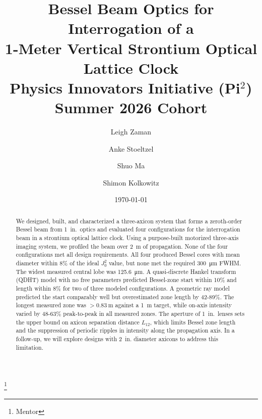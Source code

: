 \documentclass[
  aps,
  twocolumn,
  reprint,              %
  superscriptaddress,
  amsmath,
  amssymb,
  floatfix,
  longbibliography,      %
  nofootinbib %
]{revtex4-2}
\begin{document}
\title{Bessel Beam Optics for Interrogation of a \\ 1-Meter Vertical Strontium Optical Lattice Clock \\[0.4em] \normalsize\normalfont Physics Innovators Initiative (Pi$^2$) Summer 2026 Cohort}
\author{Leigh Zaman}

\author{Anke Stoeltzel}
\thanks{Mentor}

\author{Shuo Ma}

\author{Shimon Kolkowitz}

\date{\today}

\begin{abstract}

  We designed, built, and characterized a three-axicon system that forms a zeroth-order Bessel beam from 1~in.\ optics and evaluated four configurations for the interrogation beam in a strontium optical lattice clock. Using a purpose-built motorized three-axis imaging system, we profiled the beam over \SI{2}{\meter} of propagation.  None of the four configurations met all design requirements. All four produced Bessel cores with mean diameter within 8\% of the ideal $J_0^2$ value, but none met the required \SI{300}{\micro\meter} FWHM. The widest measured central lobe was \SI{125.6}{\micro\meter}. A quasi-discrete Hankel transform (QDHT) model with no free parameters predicted Bessel-zone start within 10\% and length within 8\% for two of three modeled configurations. A geometric ray model predicted the start comparably well but overestimated zone length by 42-89\%. The longest measured zone was ${>}\SI{0.83}{\meter}$ against a \SI{1}{\meter} target, while on-axis intensity varied by 48-63\% peak-to-peak in all measured zones. The aperture of 1~in.\ lenses sets the upper bound on axicon separation distance $L_{12}$, which limits Bessel zone length and the suppression of periodic ripples in intensity along the propagation axis. In a follow-up, we will explore designs with 2~in. diameter axicons to address this limitation.
\end{abstract}
\maketitle
\end{document}
